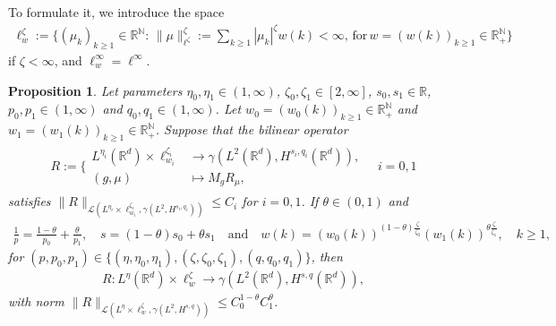 \documentclass[reqno]{amsart}
\theoremstyle{plain}
\theoremstyle{remark}
\theoremstyle{plain}
\newtheorem{proposition}[theorem]{Proposition}
\numberwithin{equation}{section}
\newcommand\bN{\mathbb{N}}
\newcommand\bR{\mathbb{R}}
\newcommand\cL{\mathcal{L}}
\def\R{{\mathbb R}}
\newcommand{\1}{\one}
\begin{document}
To formulate it, we introduce the space
\begin{align}
    \ell^\zeta_w:=\Big\{(\mu_k)_{k\geq 1}\in \bR^\bN:\,\|\mu\|_{\ell^\zeta}^\zeta:=\sum_{k\geq 1}|\mu_k|^\zeta w(k)<\infty,\, \text{for}\,w = (w(k))_{k\geq 1}\in \bR_+^\bN \Big\}
\end{align}
if $\zeta<\infty$, and $\ell^\infty_w = \ell^\infty$. 

\begin{proposition}
    \label{prop: interpolation}
    Let parameters $\eta_0,\eta_1\in (1,\infty)$,  $\zeta_0, \zeta_1\in [2, \infty]$, $s_0,s_1\in \bR$, $p_0,p_1\in (1,\infty)$ and $q_0,q_1\in (1,\infty)$.
    Let $w_0 = (w_0(k))_{k\geq 1}\in \bR_+^\bN$ and $w_1 = (w_1(k))_{k\geq 1}\in\bR_+^\bN$. 
Suppose  that the bilinear operator
    \begin{align}
        R:=\Bigg\{\begin{split}
        L^{\eta_i}(\R^d)\times \ell^{\zeta_i}_{w_i}&\rightarrow \gamma(L^2(\R^d),H^{s_i,q_i}(\R^d)),\\
        (g,\mu)&\mapsto M_gR_\mu,
        \end{split}
        \quad i = 0,1
    \end{align}
    satisfies $\|R\|_{\cL(L^{\eta_i}\times\ell^{\zeta_i}_{w_i},\gamma (L^2,H^{s_i,q_i}))}\leq C_i$ for $i = 0,1$.
    If $\theta\in (0,1)$ and
    \begin{align}
        \frac{1}{p} = \frac{1-\theta}{p_0}+\frac{\theta}{p_1},\quad s = (1-\theta)s_0 + \theta s_1 
        \quad\text{and}\quad
        w(k) = (w_0(k))^{(1-\theta)\frac{\zeta}{\zeta_0}}(w_1(k))^{\theta\frac{\zeta}{\zeta_1}},\quad k\geq 1,
    \end{align}
    for $(p,p_0,p_1)\in \{(\eta,\eta_0, \eta_1),(\zeta,\zeta_0, \zeta_1),(q,q_0, q_1)\}$, then
    \begin{align}
        R:
        L^{\eta}(\R^d)\times \ell^{\zeta}_w\rightarrow \gamma(L^2(\R^d),H^{s,q}(\R^d)),
    \end{align}
    with norm $\|R\|_{\cL(L^{\eta}\times\ell^{\zeta}_w,\gamma (L^2,H^{s,q}))}\leq C_0^{1-\theta}C_1^\theta$.
\end{proposition}
\end{document}
